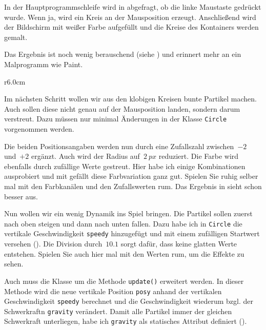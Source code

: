 In der Hauptprogrammschleife wird in  abgefragt, ob die linke Maustaste gedrückt wurde. Wenn ja, wird ein Kreis an der Mausposition erzeugt. Anschließend wird der Bildschirm mit weißer Farbe aufgefüllt und die Kreise des Kontainers werden gemalt.

Das Ergebnis ist noch wenig berauschend (siehe ) und erinnert mehr an ein Malprogramm wie Paint.


\begin{wrapfigure}[10]{r}{6.0cm}%
	\begin{center}%
		\vspace{-1cm}%
	\end{center}%
\end{wrapfigure}%
Im nächsten Schritt wollen wir aus den klobigen Kreisen bunte Partikel machen. Auch sollen diese nicht genau auf der Mausposition landen, sondern darum verstreut. Dazu müssen nur minimal Änderungen in der Klasse \texttt{Circle} vorgenommen werden.

Die beiden Positionsangaben werden nun durch eine Zufallszahl zwischen~$-2$ und~$+2$ ergänzt. Auch wird der Radius auf~$2~px$ reduziert. Die Farbe wird ebenfalls durch zufällige Werte gestreut. Hier habe ich einige Kombinationen ausprobiert und mit gefällt diese Farbvariation ganz gut. Spielen Sie ruhig selber mal mit den Farbkanälen und den Zufallswerten rum. Das Ergebnis in  sieht schon besser aus. 


Nun wollen wir ein wenig Dynamik ins Spiel bringen. Die Partikel sollen zuerst nach oben steigen und dann nach unten fallen. Dazu habe ich in \texttt{Circle} die vertikale Geschwindigkeit \texttt{speedy} hinzugefügt und mit einem zufälligen Startwert versehen (). Die Division durch~$10.1$ sorgt dafür, dass keine glatten Werte entstehen. Spielen Sie auch hier mal mit den Werten rum, um die Effekte zu sehen.

Auch muss die Klasse um die Methode \texttt{update()} erweitert werden. In dieser Methode wird die neue vertikale Position \texttt{posy} anhand der vertikalen Geschwindigkeit \texttt{speedy} berechnet und die Geschwindigkeit wiederum bzgl. der Schwerkraftn \texttt{gravity} verändert. Damit alle Partikel immer der gleichen Schwerkraft unterliegen, habe ich \texttt{gravity} als statisches Attribut definiert ().

